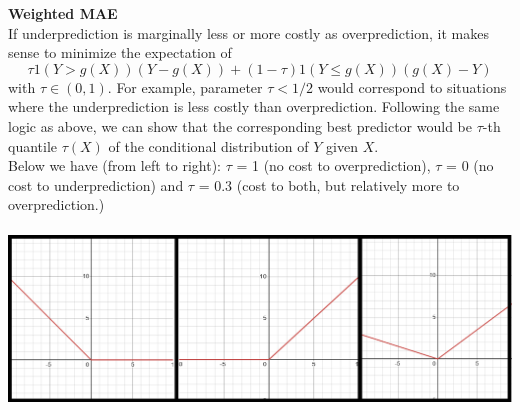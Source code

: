 \documentclass[DIV=14,titlepage=false]{scrreprt}
\begin{document}
\textbf{Weighted MAE}\\
If underprediction is marginally less or more costly as overprediction, it makes sense to minimize the expectation of
\[
\tau 1(Y > g(X))(Y - g(X)) + (1 - \tau) 1(Y \leq g(X))(g(X) - Y)
\]
with \( \tau \in (0, 1) \). For example, parameter \( \tau < 1/2 \) would correspond to situations where the underprediction is less costly than overprediction. Following the same logic as above, we can show that the corresponding best predictor would be \( \tau \)-th quantile \( \tau(X) \) of the conditional distribution of \( Y \) given \( X \).\\
Below we have (from left to right): $\tau$ = 1 (no cost to overprediction), $\tau$ = 0 (no cost to underprediction) and $\tau$ = 0.3 (cost to both, but relatively more to overprediction.)\\\\
\includegraphics[width=\textwidth]{./Images/weightedMAD.png}
\end{document}
